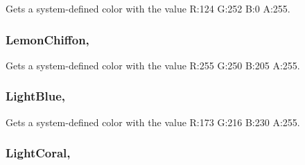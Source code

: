 Gets a system-\/defined color with the value R\+:124 G\+:252 B\+:0 A\+:255.

\hypertarget{structMicrosoft_1_1Xna_1_1Framework_1_1Color_abe9046dd36610ee0b22efdb725e3c7e7}{}
\subsubsection[{Lemon\+Chiffon}]{ Lemon\+Chiffon\hspace{0.3cm}{\ttfamily [static]}, {\ttfamily [get]}}\label{structMicrosoft_1_1Xna_1_1Framework_1_1Color_abe9046dd36610ee0b22efdb725e3c7e7}


Gets a system-\/defined color with the value R\+:255 G\+:250 B\+:205 A\+:255.

\hypertarget{structMicrosoft_1_1Xna_1_1Framework_1_1Color_a30da650b32f5eb1996e4413609a7dc7d}{}
\subsubsection[{Light\+Blue}]{ Light\+Blue\hspace{0.3cm}{\ttfamily [static]}, {\ttfamily [get]}}\label{structMicrosoft_1_1Xna_1_1Framework_1_1Color_a30da650b32f5eb1996e4413609a7dc7d}


Gets a system-\/defined color with the value R\+:173 G\+:216 B\+:230 A\+:255.

\hypertarget{structMicrosoft_1_1Xna_1_1Framework_1_1Color_a1bdfe7f6958a1a3944620845d21c5b51}{}
\subsubsection[{Light\+Coral}]{ Light\+Coral\hspace{0.3cm}{\ttfamily [static]}, {\ttfamily [get]}}\label{structMicrosoft_1_1Xna_1_1Framework_1_1Color_a1bdfe7f6958a1a3944620845d21c5b51}


